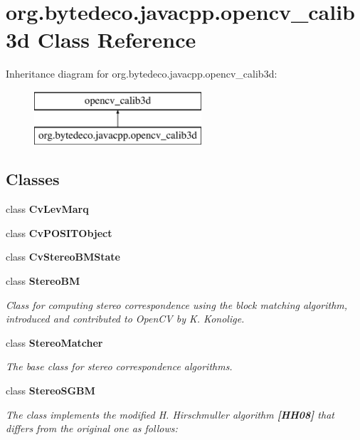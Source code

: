 \hypertarget{classorg_1_1bytedeco_1_1javacpp_1_1opencv__calib3d}{}\section{org.\+bytedeco.\+javacpp.\+opencv\+\_\+calib3d Class Reference}
\label{classorg_1_1bytedeco_1_1javacpp_1_1opencv__calib3d}
Inheritance diagram for org.\+bytedeco.\+javacpp.\+opencv\+\_\+calib3d\+:\begin{figure}[H]
\begin{center}
\leavevmode
\includegraphics[height=2.000000cm]{classorg_1_1bytedeco_1_1javacpp_1_1opencv__calib3d}
\end{center}
\end{figure}
\subsection*{Classes}
\begin{DoxyCompactItemize}
\item 
class {\bfseries Cv\+Lev\+Marq}
\item 
class {\bfseries Cv\+P\+O\+S\+I\+T\+Object}
\item 
class {\bfseries Cv\+Stereo\+B\+M\+State}
\item 
class {\bfseries Stereo\+BM}
\begin{DoxyCompactList}\small\item\em Class for computing stereo correspondence using the block matching algorithm, introduced and contributed to Open\+CV by K. Konolige. \end{DoxyCompactList}\item 
class {\bfseries Stereo\+Matcher}
\begin{DoxyCompactList}\small\item\em The base class for stereo correspondence algorithms. \end{DoxyCompactList}\item 
class {\bfseries Stereo\+S\+G\+BM}
\begin{DoxyCompactList}\small\item\em The class implements the modified H. Hirschmuller algorithm {\bfseries [H\+H08]} that differs from the original one as follows\+: \end{DoxyCompactList}\end{DoxyCompactItemize}
